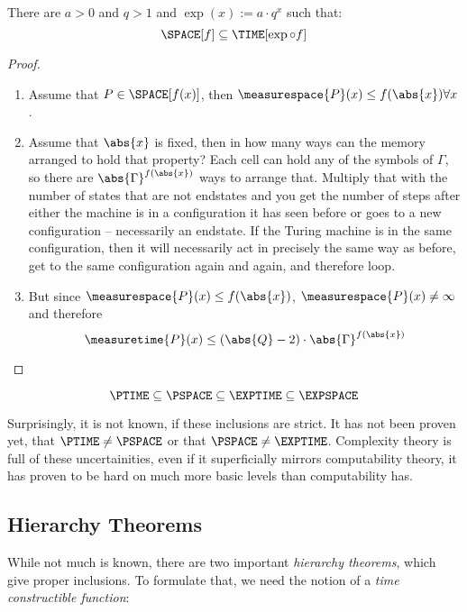 \begin{theorem}
	There are $a>0$ and $q > 1$ and $\exp(x) := a\cdot q^x$ such that:
	\[\SPACE[f] \subseteq \TIME[\exp\circ f]\]
\end{theorem}
\begin{proof}
	\begin{enumerate}
		\item Assume that $P\in\SPACE[f(x)]$, then $\measurespace{P}(x)\leq f(\abs{x})\forall x$.
		\item Assume that $\abs{x}$ is fixed, then in how many ways can the 
			memory arranged to hold that property? Each cell can hold any of the 
			symbols of $\Gamma$, so there are $\abs{\Gamma}^{f(\abs{x})}$ ways to 
			arrange that. Multiply that with the number of states that are not
			endstates and you get the number of steps after either the machine is in
			a configuration it has seen before or goes to a new configuration --
			necessarily an endstate. If the Turing machine is in the same
			configuration, then it will necessarily act in precisely the same way 
			as before, get to the same configuration again and again, and therefore loop. 
		\item But since $\measurespace{P}(x)\leq f(\abs{x})$, 
			$\measurespace{P}(x) \neq \infty$ and therefore 
			\[\measuretime{P}(x)\leq (\abs{Q} - 2)\cdot\abs{\Gamma}^{f(\abs{x})}\]
	\end{enumerate}
\end{proof}

\begin{corrolary}
	\[ %
		\PTIME\subseteq\PSPACE\subseteq\EXPTIME\subseteq\EXPSPACE \]
\end{corrolary}

Surprisingly, it is not known, if these inclusions are strict. It has not 
been proven yet, that $\PTIME\neq \PSPACE$ or that $\PSPACE\neq\EXPTIME$. 
Complexity theory is full of these uncertainities, even if it superficially 
mirrors computability theory, it has proven to be hard on much more basic
levels than computability has.

\subsection{Hierarchy Theorems}
While not much is known, there are two important {\em hierarchy theorems}, 
which give proper inclusions. To formulate that, we need the notion of a {\em 
time constructible function}\/:

